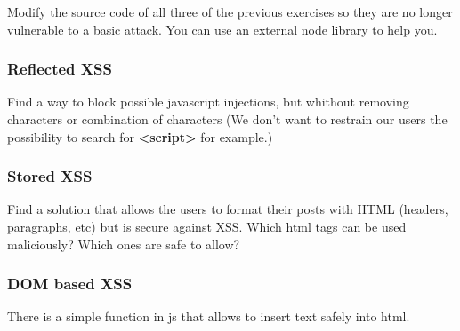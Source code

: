 \begin{Exercise}[label={websec-xss-prevention}]
	Modify the source code of all three of the previous exercises so they are no longer vulnerable to a basic attack. You can use an external node library to help you.
	
	\subsubsection{Reflected XSS}
	Find a way to block possible javascript injections, but whithout removing characters or combination of characters (We don't want to restrain our users the possibility to search for \textbf{<script>} for example.)
	\subsubsection{Stored XSS}
	Find a solution that allows the users to format their posts with HTML (headers, paragraphs, etc) but is secure against XSS. Which html tags can be used maliciously? Which ones are safe to allow?
	\subsubsection{DOM based XSS}
	There is a simple function in js that allows to insert text safely into html.
\end{Exercise}

